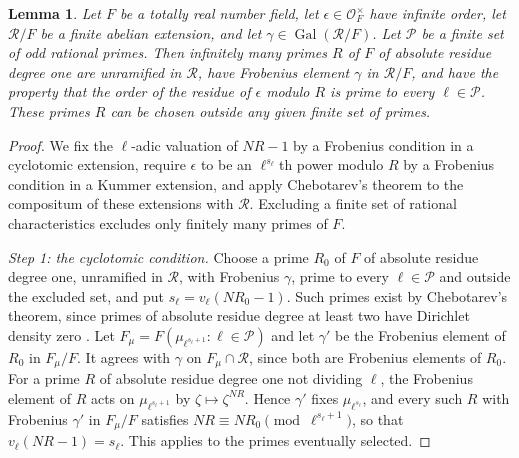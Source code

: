 \documentclass[11pt]{article}
\theoremstyle{plain}
\newtheorem{lemma}[theorem]{Lemma}
\theoremstyle{definition}
\theoremstyle{remark}
\DeclareMathOperator{\Gal}{Gal}
\newcommand{\OO}{\mathcal O}
\begin{document}
\begin{lemma}\label{lem:order-avoidance}
Let $F$ be a totally real number field, let $\epsilon\in\OO_F^\times$ have
infinite order, let $\mathcal R/F$ be a finite abelian extension, and let
$\gamma\in\Gal(\mathcal R/F)$.  Let $\mathcal P$ be a finite set of odd
rational primes.  Then infinitely many primes $R$ of $F$ of absolute
residue degree one are unramified in $\mathcal R$, have Frobenius element
$\gamma$ in $\mathcal R/F$, and have the property that the order of the
residue of $\epsilon$ modulo $R$ is prime to every $\ell\in\mathcal P$.
These primes $R$ can be chosen outside any given finite set of primes.
\end{lemma}
\begin{proof}
We fix the $\ell$-adic valuation of $NR-1$ by a Frobenius condition in a
cyclotomic extension, require $\epsilon$ to be an $\ell^{s_\ell}$th
power modulo $R$ by a Frobenius condition in a Kummer extension, and apply
Chebotarev's theorem to the compositum of these extensions with
$\mathcal R$.  Excluding a finite set of rational characteristics
excludes only finitely many primes of $F$.

\emph{Step 1: the cyclotomic condition.}  Choose a prime $R_0$ of $F$ of
absolute residue degree one, unramified in $\mathcal R$, with Frobenius
$\gamma$, prime to every $\ell\in\mathcal P$ and outside the excluded
set, and put $s_\ell=v_\ell(NR_0-1)$.  Such primes exist by Chebotarev's
theorem, since primes of absolute residue degree at least two have
Dirichlet density zero \cite[Chapter~VI, Proposition~4.5 and Corollary~4.6]{MilneCFT}.  Let
$F_\mu=F(\mu_{\ell^{s_\ell+1}}:\ell\in\mathcal P)$ and let $\gamma'$ be the
Frobenius element of $R_0$ in $F_\mu/F$.  It agrees with $\gamma$ on
$F_\mu\cap\mathcal R$, since both are Frobenius elements of $R_0$.  For a
prime $R$ of absolute residue degree one not dividing $\ell$, the
Frobenius element of $R$ acts on $\mu_{\ell^{s_\ell+1}}$ by
$\zeta\mapsto\zeta^{NR}$.  Hence $\gamma'$ fixes $\mu_{\ell^{s_\ell}}$,
and every such $R$ with Frobenius $\gamma'$ in $F_\mu/F$ satisfies
$NR\equiv NR_0\pmod{\ell^{s_\ell+1}}$, so that $v_\ell(NR-1)=s_\ell$.  This
applies to the primes eventually selected.


\end{proof}
\end{document}

